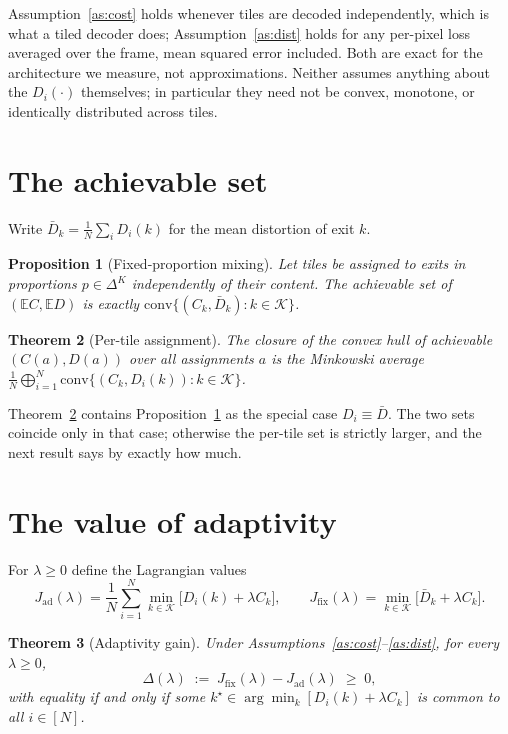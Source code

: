 \documentclass[10pt]{article}
\theoremstyle{plain}
\newtheorem{theorem}{Theorem}
\newtheorem{proposition}[theorem]{Proposition}
\theoremstyle{definition}
\newcommand{\Ex}{\mathbb{E}}
\begin{document}
Assumption~\ref{as:cost} holds whenever tiles are decoded independently, which
is what a tiled decoder does; Assumption~\ref{as:dist} holds for any per-pixel
loss averaged over the frame, mean squared error included. Both are exact for
the architecture we measure, not approximations. Neither assumes anything about
the $D_i(\cdot)$ themselves; in particular they need not be convex, monotone,
or identically distributed across tiles.

\section{The achievable set}

Write $\bar D_k=\frac1N\sum_i D_i(k)$ for the mean distortion of exit $k$.

\begin{proposition}[Fixed-proportion mixing]\label{prop:hull}
Let tiles be assigned to exits in proportions $p\in\Delta^{K}$ independently of
their content. The achievable set of $(\Ex C,\Ex D)$ is exactly
$\mathrm{conv}\{(C_k,\bar D_k):k\in\mathcal{K}\}$.
\end{proposition}

\begin{theorem}[Per-tile assignment]\label{thm:minkowski}
The closure of the convex hull of achievable $(C(a),D(a))$ over all assignments
$a$ is the Minkowski average
$\frac1N\bigoplus_{i=1}^{N}\mathrm{conv}\{(C_k,D_i(k)):k\in\mathcal{K}\}$.
\end{theorem}

Theorem~\ref{thm:minkowski} contains Proposition~\ref{prop:hull} as the special
case $D_i\equiv\bar D$. The two sets coincide only in that case; otherwise the
per-tile set is strictly larger, and the next result says by exactly how much.

\section{The value of adaptivity}

For $\lambda\ge 0$ define the Lagrangian values
\begin{equation}\label{eq:J}
J_{\mathrm{ad}}(\lambda)=\frac1N\sum_{i=1}^{N}\min_{k\in\mathcal{K}}
\bigl[D_i(k)+\lambda C_k\bigr],
\qquad
J_{\mathrm{fix}}(\lambda)=\min_{k\in\mathcal{K}}
\bigl[\bar D_k+\lambda C_k\bigr].
\end{equation}

\begin{theorem}[Adaptivity gain]\label{thm:gain}
Under Assumptions~\ref{as:cost}--\ref{as:dist}, for every $\lambda\ge0$,
\begin{equation}\label{eq:gain}
\Delta(\lambda)\;:=\;J_{\mathrm{fix}}(\lambda)-J_{\mathrm{ad}}(\lambda)\;\ge\;0,
\end{equation}
with equality if and only if some $k^\star\in\arg\min_k[D_i(k)+\lambda C_k]$ is
common to all $i\in[N]$.
\end{theorem}
\end{document}

